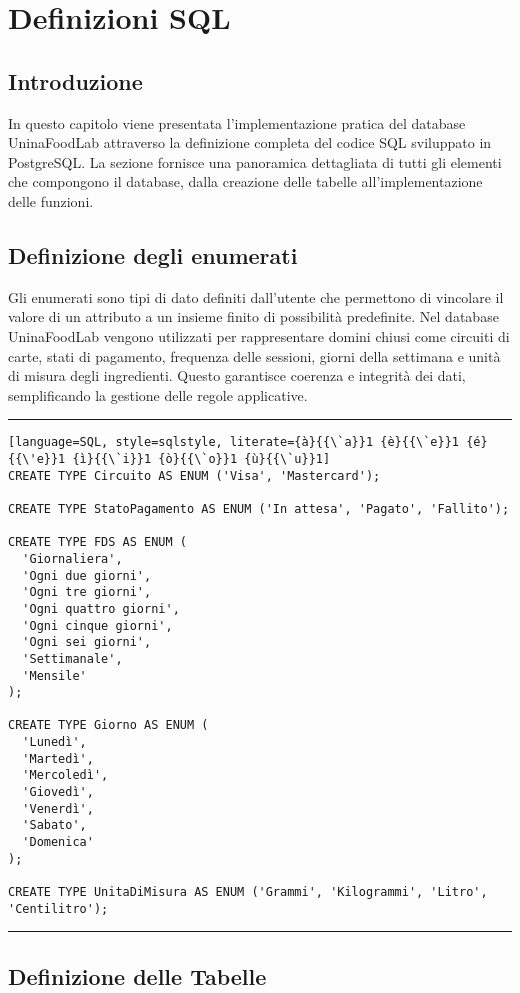 \section{Definizioni SQL}

\subsection{Introduzione}

In questo capitolo viene presentata l'implementazione pratica del database UninaFoodLab attraverso la definizione completa del codice SQL sviluppato in PostgreSQL. La sezione fornisce una panoramica dettagliata di tutti gli elementi che compongono il database, dalla creazione delle tabelle all'implementazione delle funzioni.


\subsection{Definizione degli enumerati}

Gli enumerati sono tipi di dato definiti dall’utente che permettono di vincolare il valore di un attributo a un insieme finito di possibilità predefinite. Nel database UninaFoodLab vengono utilizzati per rappresentare domini chiusi come circuiti di carte, stati di pagamento, frequenza delle sessioni, giorni della settimana e unità di misura degli ingredienti. Questo garantisce coerenza e integrità dei dati, semplificando la gestione delle regole applicative.

\noindent\rule{\textwidth}{0.4pt}
\begin{lstlisting}[language=SQL, style=sqlstyle, literate={à}{{\`a}}1 {è}{{\`e}}1 {é}{{\'e}}1 {ì}{{\`i}}1 {ò}{{\`o}}1 {ù}{{\`u}}1]
CREATE TYPE Circuito AS ENUM ('Visa', 'Mastercard');

CREATE TYPE StatoPagamento AS ENUM ('In attesa', 'Pagato', 'Fallito');

CREATE TYPE FDS AS ENUM (
  'Giornaliera',
  'Ogni due giorni',
  'Ogni tre giorni',
  'Ogni quattro giorni',
  'Ogni cinque giorni',
  'Ogni sei giorni',
  'Settimanale',
  'Mensile'
);

CREATE TYPE Giorno AS ENUM (
  'Lunedì',
  'Martedì',
  'Mercoledì',
  'Giovedì',
  'Venerdì',
  'Sabato',
  'Domenica'
);

CREATE TYPE UnitaDiMisura AS ENUM ('Grammi', 'Kilogrammi', 'Litro', 'Centilitro');
\end{lstlisting}
\noindent\rule{\textwidth}{0.4pt}

\subsection{Definizione delle Tabelle}


